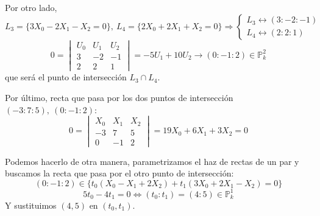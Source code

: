\documentclass[10pt,a4paper,openright]{book}
\theoremstyle{break}
\begin{document}
Por otro lado,
\[
L_3 = \{3X_0 - 2X_1 - X_2 = 0\},\ L_4 = \{2X_0 + 2X_1 + X_2 = 0\} \Rightarrow \begin{cases}
    L_3 \leftrightarrow \left( 3 : -2 : -1 \right)\\
    L_4 \leftrightarrow \left( 2 : 2 : 1 \right) 
\end{cases} 
\]\[
0 = \begin{vmatrix} U_0 & U_1 & U_2\\ 3 & -2 & -1\\ 2 & 2 & 1 \end{vmatrix} = -5U_1 + 10U_2 \rightarrow \left( 0 : -1 : 2 \right) \in \mathbb{P}^{2}_{k} 
\]
que será el punto de intersección $L_3 \cap L_4$.

Por último, recta que pasa por los dos puntos de intersección $\left( -3 : 7 : 5 \right),\ \left( 0 : -1 : 2 \right)$:
\[
    0 = \begin{vmatrix} X_0 & X_1 & X_2\\ -3 & 7 & 5\\ 0 & -1 & 2 \end{vmatrix} = \boxed{19X_0 + 6X_1 + 3X_2 =  0} 
\]

Podemos hacerlo de otra manera, parametrizamos el haz de rectas de un par y buscamos la recta que pasa por el otro punto de intersección:
\[
\left( 0 : -1 : 2 \right) \in \{t_0 \left( X_0 - X_1 + 2X_2 \right) + t_1\left( 3X_0 + 2X_1 - X_2 \right) = 0\} 
\]\[
5t_0 - 4t_1 = 0 \Leftrightarrow \left( t_0 : t_1 \right) = \left( 4 : 5 \right) \in \mathbb{P}^{1}_{k} 
\]
Y sustituimos $\left( 4, 5 \right)$ en $\left( t_0, t_1 \right)$.
\end{document}
